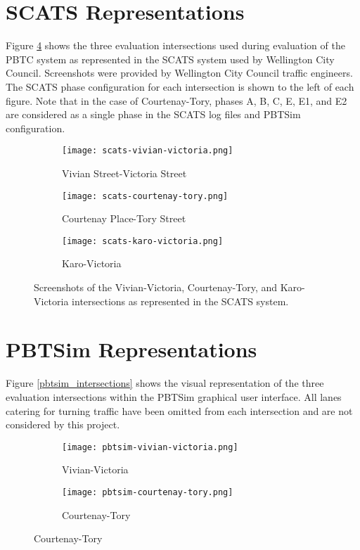 \begin{appendices}
\section{SCATS Representations} 

Figure \ref{scats_intersections} shows the three evaluation intersections used during evaluation of the PBTC system as represented in the SCATS system used by Wellington City Council. Screenshots were provided by Wellington City Council traffic engineers. The SCATS phase configuration for each intersection is shown to the left of each figure. Note that in the case of Courtenay-Tory, phases A, B, C, E, E1, and E2 are considered as a single phase in the SCATS log files and PBTSim configuration.


\begin{figure}[]
\centering
\begin{subfigure}{.5\textwidth}
  \centering
  \texttt{[image: scats-vivian-victoria.png]}
  \caption{Vivian Street-Victoria Street}
  \label{fig:sub1}
\end{subfigure}%
\begin{subfigure}{.5\textwidth}
  \centering
  \texttt{[image: scats-courtenay-tory.png]}
  \caption{Courtenay Place-Tory Street}
  \label{fig:sub2}
\end{subfigure}

\vspace{1cm}

\begin{subfigure}{.5\textwidth}
  \centering
  \texttt{[image: scats-karo-victoria.png]}
  \caption{Karo-Victoria}
  \label{fig:sub1}
\end{subfigure}%
\caption{ Screenshots of the Vivian-Victoria, Courtenay-Tory, and Karo-Victoria intersections as represented in the SCATS system. }
\label{scats_intersections}
\end{figure}

\section{PBTSim Representations}

Figure \ref{pbtsim_intersections} shows the visual representation of the three evaluation intersections within the PBTSim graphical user interface. All lanes catering for turning traffic have been omitted from each intersection and are not considered by this project. 

\begin{figure}[]
\centering
\begin{subfigure}{.5\textwidth}
  \centering
  \texttt{[image: pbtsim-vivian-victoria.png]}
  \caption{Vivian-Victoria}
  \label{fig:sub1}
\end{subfigure}%
\begin{subfigure}{.5\textwidth}
  \centering
  \texttt{[image: pbtsim-courtenay-tory.png]}
  \caption{Courtenay-Tory}
  \label{fig:sub2}
\end{subfigure}


\end{figure}
\end{appendices}
